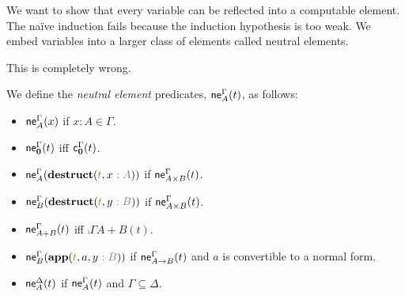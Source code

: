 \documentclass[a4paper]{article}
\begin{document}
We want to show that every variable can be reflected into a computable element.
The na\"ive induction fails because the induction hypothesis is too weak.
We embed variables into a larger class of elements called neutral elements.

\todo This is completely wrong.
\begin{definition}
  We define the \emph{neutral element} predicates, $\operatorname{\mathsf{ne}}^{\Gamma}_{A}(t)$, as follows:
  \begin{itemize}
  \item[] $\operatorname{\mathsf{ne}}^{\Gamma}_{A}(x)$ if $x : A \in \Gamma$.
  \item[] $\operatorname{\mathsf{ne}}^{\Gamma}_{\mathbf{0}}(t)$ iff $\operatorname{\mathsf{c}}^{\Gamma}_{\mathbf{0}}(t)$.
  \item[] $\neu{\Gamma}{A}(\tmDestruct{t}{x\tpAnno{A}})$ if $\operatorname{\mathsf{ne}}^{\Gamma}_{A \times B}(t)$.
  \item[] $\neu{\Gamma}{B}(\tmDestruct{t}{y\tpAnno{B}})$ if $\operatorname{\mathsf{ne}}^{\Gamma}_{A \times B}(t)$.
  \item[] $\operatorname{\mathsf{ne}}^{\Gamma}_{A + B}(t)$ iff $\comp{\Gamma}{A + B}(t)$.
  \item[] $\neu{\Gamma}{B}(\tmApp{t}{a}{y\tpAnno{B}})$ if $\operatorname{\mathsf{ne}}^{\Gamma}_{A \to B}(t)$ and $a$ is convertible to a normal form.
  \item[] $\operatorname{\mathsf{ne}}^{\Delta}_{A}(t)$ if $\operatorname{\mathsf{ne}}^{\Gamma}_{A}(t)$ and $\Gamma \subseteq \Delta$.
  \end{itemize}
\end{definition}
\end{document}
